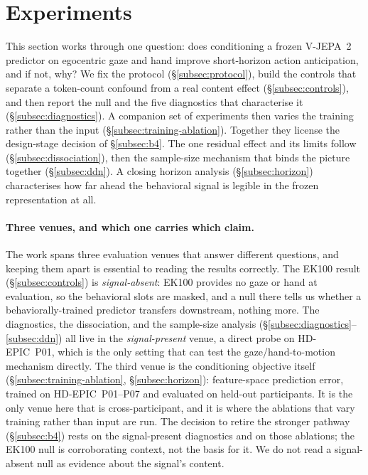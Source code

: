 \section{Experiments}

This section works through one question: does conditioning a frozen V-JEPA~2
predictor on egocentric gaze and hand improve short-horizon action anticipation,
and if not, why? We fix the protocol (\S\ref{subsec:protocol}), build the
controls that separate a token-count confound from a real content effect
(\S\ref{subsec:controls}), and then report the null and the five diagnostics that
characterise it (\S\ref{subsec:diagnostics}). A companion set of
experiments then varies the training rather than the input
(\S\ref{subsec:training-ablation}). Together they license the design-stage
decision of \S\ref{subsec:b4}. The one residual effect and its
limits follow (\S\ref{subsec:dissociation}), then the sample-size mechanism that
binds the picture together (\S\ref{subsec:ddn}). A closing horizon analysis
(\S\ref{subsec:horizon}) characterises how far ahead the behavioral signal is
legible in the frozen representation at all.

\paragraph{Three venues, and which one carries which claim.}
The work spans three evaluation venues that answer different questions, and
keeping them apart is essential to reading the results correctly. The EK100 result
(\S\ref{subsec:controls}) is \emph{signal-absent}: EK100 provides no gaze or hand
at evaluation, so the behavioral slots are masked, and a null there tells us
whether a behaviorally-trained predictor transfers downstream, nothing more. The
diagnostics, the dissociation, and the sample-size analysis
(\S\ref{subsec:diagnostics}--\ref{subsec:ddn}) all live in the \emph{signal-present}
venue, a direct probe on HD-EPIC~P01, which is the only setting that can test the
gaze/hand-to-motion mechanism directly. The third venue is the conditioning objective itself
(\S\ref{subsec:training-ablation}, \S\ref{subsec:horizon}): feature-space
prediction error, trained on HD-EPIC~P01--P07 and evaluated on held-out
participants. It is the only venue here that is cross-participant, and it is
where the ablations that vary training rather than input are run. The decision to
retire the stronger pathway (\S\ref{subsec:b4}) rests on the signal-present
diagnostics and on those ablations; the EK100 null is corroborating context, not
the basis for it. We do not read a
signal-absent null as evidence about the signal's content.

